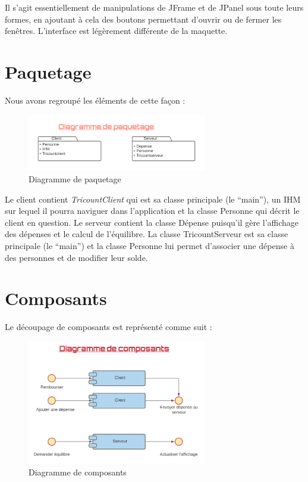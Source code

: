 \documentclass[12,french]{report}
\begin{document}
Il s'agit essentiellement de manipulations de JFrame et de JPanel sous toute leurs formes, en ajoutant à cela des boutons permettant d'ouvrir ou de fermer les fenêtres. L'interface est légèrement différente de la maquette.

\section{Paquetage}

Nous avons regroupé les éléments de cette façon : \\

\begin{figure}[H]
	\center
	\includegraphics[width=0.7\textwidth]{./Images_pooa/Paquetage}
	\caption{Diagramme de paquetage}
\end{figure}\vspace{0.2cm}

Le client contient \textit{TricountClient} qui est sa classe principale (le “main”), un IHM sur lequel il pourra naviguer dans l’application et la classe Personne qui décrit le client en question. 
Le serveur contient la classe Dépense puisqu’il gère l’affichage des dépenses et le calcul de l’équilibre. La classe TricountServeur est sa classe principale (le “main”) et la classe Personne lui permet d’associer une dépense à des personnes et de modifier leur solde.

\section{Composants}

Le découpage de composants est représenté comme suit :\\

\begin{figure}[H]
	\center
	\includegraphics[width=0.7\textwidth]{./Images_pooa/Composants}
	\caption{Diagramme de composants}
\end{figure}\vspace{0.2cm}
\end{document}
